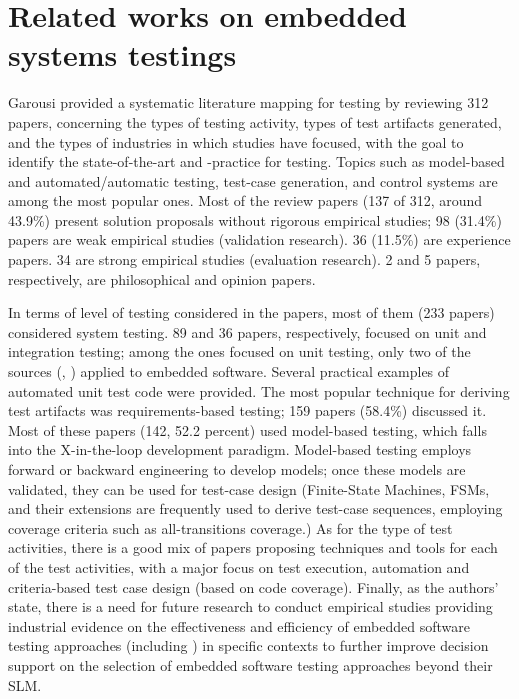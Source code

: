 \section{Related works on embedded systems testings}
Garousi \etal \cite{DBLP:journals/infsof/GarousiFKY18} provided a systematic literature mapping for \es testing by reviewing 312 papers, concerning the types of testing activity, types of test artifacts generated, and the types of industries in which studies have focused, with the goal to identify the state-of-the-art and -practice for \ess testing.
Topics such as model-based and automated/automatic testing, test-case generation, and control systems are among the most popular ones. Most of the review papers (137 of 312, around 43.9\%) present solution proposals without rigorous empirical studies; 98 (31.4\%) papers are weak empirical studies (validation research). 36 (11.5\%) are experience papers. 34 are strong empirical studies (evaluation research). 2 and 5 papers, respectively, are philosophical and opinion papers.

In terms of level of testing considered in the papers, most of them (233 papers) considered system testing. 89 and 36 papers, respectively, focused on unit and integration testing; among the ones focused on unit testing, only two of the sources (\cite{4428578}, \cite{DBLP:conf/isese/GuanOA06}) applied \tdd to embedded software. Several practical examples of automated unit test code were provided.
The most popular technique for deriving test artifacts was requirements-based testing; 159 papers (58.4\%) discussed it. Most of these papers (142, 52.2 percent) used model-based testing, which falls into the X-in-the-loop development paradigm.
Model-based testing employs forward or backward engineering to develop models; once these models are validated, they can be used for test-case design (\eg Finite-State Machines, FSMs, and their extensions are frequently used to derive test-case sequences, employing coverage criteria such as all-transitions coverage.)
As for the type of test activities, there is a good mix of papers proposing techniques and tools for each of the test activities, with a major focus on test execution, automation and criteria-based test case design (\eg based on code coverage).
Finally, as the authors' state, there is a need for future research to conduct empirical studies providing industrial evidence on the effectiveness and efficiency of embedded software testing approaches (including \tdd) in specific contexts to further improve decision support on the selection of embedded software testing approaches beyond their SLM.

